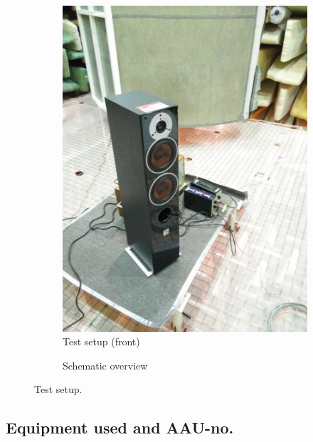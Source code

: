 \begin{figure}[H]
\begin{subfigure}[t]{0.47\textwidth}
	\includegraphics[width=1\textwidth]{figures/Test_setup_front.jpg}
	\caption{Test setup (front)}
	\label{fig:test_setup_front_R}
\end{subfigure}
\begin{subfigure}[b]{\textwidth}
	\centering
	
	\caption{Schematic overview}
	\label{figure:SpeakertestSetup}
\end{subfigure}
\caption{Test setup.}
\label{fig:test_setup_R}
\end{figure}





\subsection*{Equipment used and AAU-no.}

